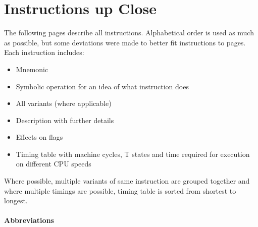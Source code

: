 \documentclass[12pt,twoside,openright,a4paper]{book}
\begin{document}
\chapter{Instructions up Close}
\label{instruction_details}

\newcommand{\DetailParityOverflow}[1]{
	\IfEqCase{#1}
	{
		{p}{
			\small
			\setlength{\unitlength}{0.2mm}
			\begin{picture}(20,10)
				\put(-5.6,7){\circle{20}}
				\put(-11,0){P}
				\put(4,0){V}
			\end{picture}
		}
		{v}{
			\small
			\setlength{\unitlength}{0.2mm}
			\begin{picture}(20,10)
				\put(11,7){\circle{20}}
				\put(-11,0){P}
				\put(4,0){V}
			\end{picture}
		}
		{}{PV}
	}
}
The following pages describe all instructions. Alphabetical order is used as much as possible, but some deviations were made to better fit instructions to pages. Each instruction includes:

\begin{itemize}
	\setlength\itemsep{1pt}
	\item Mnemonic
	\item Symbolic operation for an idea of what instruction does
	\item All variants (where applicable)
	\item Description with further details
	\item Effects on flags
	\item Timing table with machine cycles, T states and time required for execution on different CPU speeds
\end{itemize}

Where possible, multiple variants of same instruction are grouped together and where multiple timings are possible, timing table is sorted from shortest to longest.

\pagebreak

\subsubsection{Abbreviations}
\end{document}
